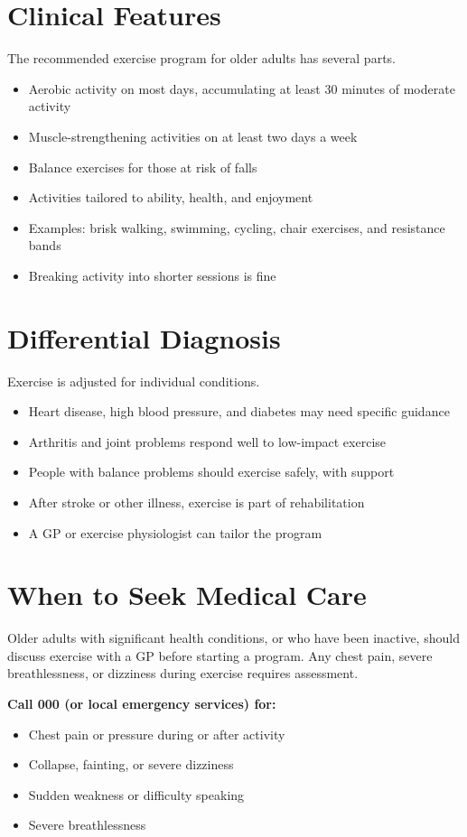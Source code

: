 \section*{Clinical Features}
The recommended exercise program for older adults has several parts.
\begin{itemize}
    \item Aerobic activity on most days, accumulating at least 30 minutes of moderate activity
    \item Muscle-strengthening activities on at least two days a week
    \item Balance exercises for those at risk of falls
    \item Activities tailored to ability, health, and enjoyment
    \item Examples: brisk walking, swimming, cycling, chair exercises, and resistance bands
    \item Breaking activity into shorter sessions is fine
\end{itemize}

\section*{Differential Diagnosis}
Exercise is adjusted for individual conditions.
\begin{itemize}
    \item Heart disease, high blood pressure, and diabetes may need specific guidance
    \item Arthritis and joint problems respond well to low-impact exercise
    \item People with balance problems should exercise safely, with support
    \item After stroke or other illness, exercise is part of rehabilitation
    \item A GP or exercise physiologist can tailor the program
\end{itemize}

\section*{When to Seek Medical Care}
Older adults with significant health conditions, or who have been inactive, should discuss exercise with a GP before starting a program. Any chest pain, severe breathlessness, or dizziness during exercise requires assessment.

\textbf{Call 000 (or local emergency services) for:}
\begin{itemize}
    \item Chest pain or pressure during or after activity
    \item Collapse, fainting, or severe dizziness
    \item Sudden weakness or difficulty speaking
    \item Severe breathlessness
\end{itemize}

